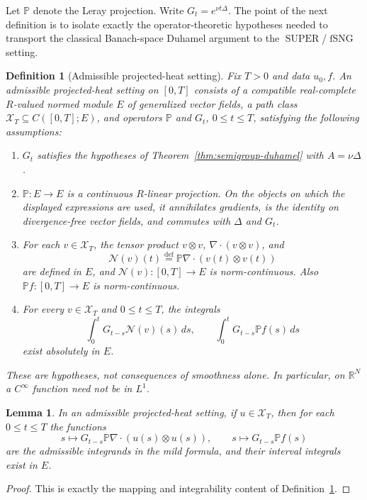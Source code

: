 \documentclass{amsart}
\newtheorem{lem}{Lemma}
\newtheorem{defn}{Definition}
\DeclareMathOperator{\SUPER}{SUPER}
\DeclareMathOperator{\fSNG}{fSNG}
\newcommand{\eqdef}{\overset{\mathrm{def}}{=}}
\begin{document}
Let $\mathbb{P}$ denote the Leray projection.
Write $G_t=e^{\nu t\Delta}$.
The point of the next definition is to isolate exactly the operator-theoretic
hypotheses needed to transport the classical Banach-space Duhamel argument to
the $\SUPER$/$\fSNG$ setting.

\begin{defn}[Admissible projected-heat setting]\label{def:admissible-projected-heat}
Fix $T>0$ and data $u_0,f$.  An admissible projected-heat setting on
$[0,T]$ consists of a compatible real-complete $R$-valued normed module $E$ of
generalized vector fields, a path class
$\mathcal X_T\subseteq C([0,T];E)$, and operators $\mathbb{P}$ and
$G_t$, $0\leq t\leq T$, satisfying the following assumptions:
\begin{enumerate}
\item $G_t$ satisfies the hypotheses of
Theorem~\ref{thm:semigroup-duhamel} with $A=\nu\Delta$.
\item $\mathbb{P}:E\to E$ is a continuous $R$-linear projection.  On the
objects on which the displayed expressions are used, it annihilates gradients,
is the identity on divergence-free vector fields, and commutes with $\Delta$
and $G_t$.
\item For each $v\in\mathcal X_T$, the tensor product $v\otimes v$,
$\nabla\cdot(v\otimes v)$, and
\[
  \mathcal N(v)(t)\eqdef
  \mathbb{P}\nabla\cdot(v(t)\otimes v(t))
\]
are defined in $E$, and $\mathcal N(v):[0,T]\to E$ is norm-continuous.
Also $\mathbb{P}f:[0,T]\to E$ is norm-continuous.
\item For every $v\in\mathcal X_T$ and $0\leq t\leq T$, the integrals
\[
  \int_0^tG_{t-s}\mathcal N(v)(s)\,ds,
  \qquad
  \int_0^tG_{t-s}\mathbb{P}f(s)\,ds
\]
exist absolutely in $E$.
\end{enumerate}
These are hypotheses, not consequences of smoothness alone.  In particular,
on $\mathbb{R}^N$ a $C^\infty$ function need not be in $L^1$.
\end{defn}

\begin{lem}\label{lem:admissible-integrand}
In an admissible projected-heat setting, if $u\in\mathcal X_T$, then for each
$0\leq t\leq T$ the functions
\[
  s\mapsto G_{t-s}\mathbb{P}\nabla\cdot(u(s)\otimes u(s)),
  \qquad
  s\mapsto G_{t-s}\mathbb{P}f(s)
\]
are the admissible integrands in the mild formula, and their interval
integrals exist in $E$.
\end{lem}

\begin{proof}
This is exactly the mapping and integrability content of
Definition~\ref{def:admissible-projected-heat}.
\end{proof}
\end{document}
